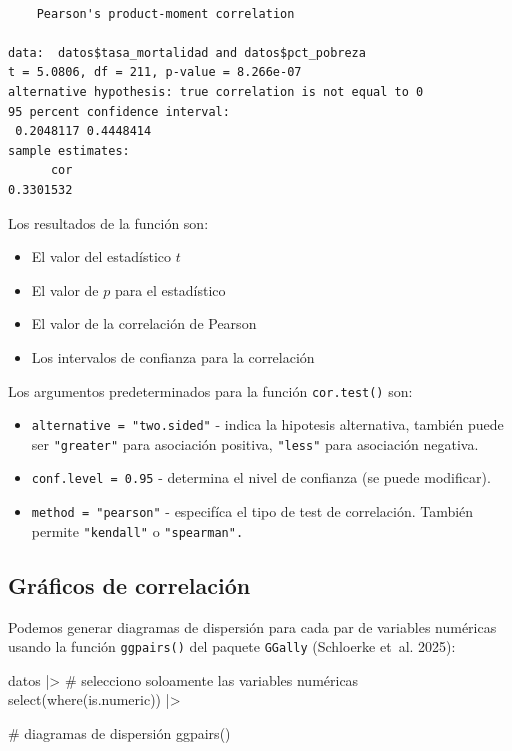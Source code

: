 \documentclass[
  spanish,
  a4paper,
]{scrbook}
\newenvironment{Shaded}{\begin{snugshade}}{\end{snugshade}}
\newcommand{\CommentTok}[1]{\textcolor[rgb]{0.37,0.37,0.37}{#1}}
\newcommand{\FunctionTok}[1]{\textcolor[rgb]{0.28,0.35,0.67}{#1}}
\newcommand{\NormalTok}[1]{\textcolor[rgb]{0.00,0.23,0.31}{#1}}
\newcommand{\SpecialCharTok}[1]{\textcolor[rgb]{0.37,0.37,0.37}{#1}}
\providecommand{\tightlist}{%
  \setlength{\itemsep}{0pt}\setlength{\parskip}{0pt}}
\begin{document}
\begin{verbatim}

    Pearson's product-moment correlation

data:  datos$tasa_mortalidad and datos$pct_pobreza
t = 5.0806, df = 211, p-value = 8.266e-07
alternative hypothesis: true correlation is not equal to 0
95 percent confidence interval:
 0.2048117 0.4448414
sample estimates:
      cor 
0.3301532 
\end{verbatim}

Los resultados de la función son:

\begin{itemize}
\tightlist
\item
  El valor del estadístico \(t\)
\item
  El valor de \(p\) para el estadístico
\item
  El valor de la correlación de Pearson
\item
  Los intervalos de confianza para la correlación
\end{itemize}

Los argumentos predeterminados para la función \texttt{cor.test()} son:

\begin{itemize}
\item
  \texttt{alternative\ =\ "two.sided"} - indica la hipotesis
  alternativa, también puede ser \texttt{"greater"} para asociación
  positiva, \texttt{"less"} para asociación negativa.
\item
  \texttt{conf.level\ =\ 0.95} - determina el nivel de confianza (se
  puede modificar).
\item
  \texttt{method\ =\ "pearson"} - especifíca el tipo de test de
  correlación. También permite \texttt{"kendall"} o \texttt{"spearman".}
\end{itemize}

\subsection{Gráficos de
correlación}\label{gruxe1ficos-de-correlaciuxf3n}

Podemos generar diagramas de dispersión para cada par de variables
numéricas usando la función \texttt{ggpairs()} del paquete
\texttt{GGally} (Schloerke et~al. 2025):

\begin{Shaded}
\begin{Highlighting}[]
\NormalTok{datos }\SpecialCharTok{|\textgreater{}}
  \CommentTok{\# selecciono soloamente las variables numéricas}
  \FunctionTok{select}\NormalTok{(}\FunctionTok{where}\NormalTok{(is.numeric)) }\SpecialCharTok{|\textgreater{}}

  \CommentTok{\# diagramas de dispersión}
  \FunctionTok{ggpairs}\NormalTok{()}
\end{Highlighting}
\end{Shaded}
\end{document}
